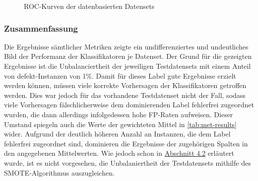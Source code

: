 \begin{figure}[ht]
  \caption{ROC-Kurven der datenbasierten Datensets \label{roc-file}}
\end{figure}

\subsubsection*{Zusammenfassung}
Die Ergebnisse sämtlicher Metriken zeigte ein undifferenziertes und undeutliches Bild der Performanz der Klassifikatoren je Datenset. Der Grund für die gezeigten Ergebnisse ist die Unbalanciertheit der jeweiligen Testdatensets mit einem Anteil von \glqq defekt\grqq -Instanzen von 1\%. Damit für dieses Label gute Ergebnisse erzielt werden können, müssen viele korrekte Vorhersagen der Klassifikatoren getroffen werden. Dies war jedoch für das vorhandene Testdatenset nicht der Fall, sodass viele Vorhersagen fälschlicherweise dem dominierenden Label \glqq fehlerfrei\grqq{} zugeordnet wurden, die dann allerdings infolgedessen hohe FP-Raten aufweisen. Dieser Umstand spiegeln auch die Werte der gewichteten Mittel in \autoref{tab:met-results} wider. Aufgrund der deutlich höheren Anzahl an Instanzen, die dem Label \glqq fehlerfrei\grqq{} zugeordnet sind, dominieren die Ergebnisse der zugehörigen Spalten in den angegebenen Mittelwerten. Wie jedoch schon in \hyperref[smote]{Abschnitt 4.2} erläutert wurde, ist es nicht vorgesehen, die Unbalaniertheit der Testdatensets mithilfe des SMOTE-Algorithmus auszugleichen.

